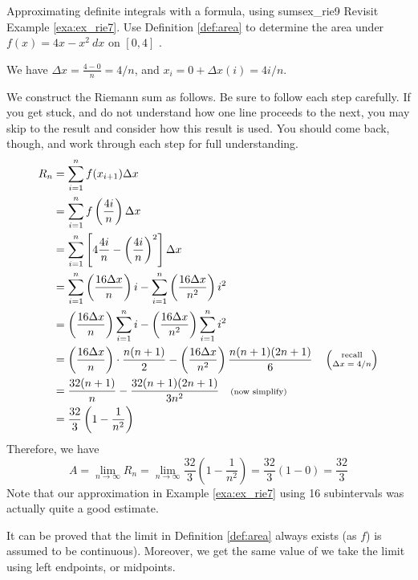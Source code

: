 \begin{example}{Approximating definite integrals with a formula, using sums}{ex_rie9}
{
Revisit Example \ref{exa:ex_rie7}. Use Definition \ref{def:area} to determine the area under $f(x) = 4x-x^2 \ dx$ on $ [0,4] $ .}
\end{example}

\begin{solution}
We have $\Delta x = \frac{4-0}{n} = 4/n$, and $x_i = 0 + \Delta x(i) = 4i/n$.

We construct the Riemann sum as follows. Be sure to follow each step carefully. If you get stuck, and do not understand how one line proceeds to the next, you may skip to the result and consider how this result is used. You should come back, though, and work through each step for full understanding.
\begin{align*}
		R_n &= \sum_{i=1}^n f(x_{i+1})\Delta x \\
											&= \sum_{i=1}^n f\left(\frac{4i}{n}\right) \Delta x \\
											&=	\sum_{i=1}^n \left[4\frac{4i}n-\left(\frac{4i}n\right)^2\right]\Delta x\\
											&=	\sum_{i=1}^n \left(\frac{16\Delta x}{n}\right)i - \sum_{i=1}^n \left(\frac{16\Delta x}{n^2}\right)i^2 \\
											&=	\left(\frac{16\Delta x}{n}\right)\sum_{i=1}^n i - \left(\frac{16\Delta x}{n^2}\right)\sum_{i=1}^n i^2  \\
											&= \left(\frac{16\Delta x}{n}\right)\cdot \frac{n(n+1)}{2} - \left(\frac{16\Delta x}{n^2}\right)\frac{n(n+1)(2n+1)}{6} \quad \left(\parbox{35pt}{\scriptsize \centering recall $\Delta x = 4/n$}\right)\\
											&=\frac{32(n+1)}{n} - \frac{32(n+1)(2n+1)}{3n^2} \quad \text{\scriptsize (now simplify)} \\
											&= \frac{32}{3}\left(1-\frac{1}{n^2}\right)
\end{align*}
Therefore, we have
\[
A=\lim_{n\to \infty}R_n = \lim_{n\to \infty}\frac{32}{3}\left(1-\frac{1}{n^2}\right)=\frac{32}{3}\left(1-0\right)=\frac{32}{3}
\]
Note that our approximation in Example \ref{exa:ex_rie7} using 16 subintervals was actually quite a good estimate. 
\end{solution}




It can be proved that the limit in Definition \ref{def:area} always exists (as $ f $) is assumed to be continuous). Moreover, we get the same value of we take the limit using left endpoints, or midpoints. 



